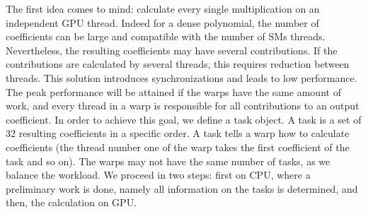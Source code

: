 \documentclass[oribibl]{llncs2e/llncs}
\begin{document}
The first idea comes to mind: calculate every single multiplication on an independent GPU thread. Indeed for a dense polynomial, the number of coefficients can be large and compatible with the number of SMs threads. Nevertheless, the resulting coefficients may have several contributions. If the contributions are calculated by several threads, this requires reduction between threads. This solution introduces   synchronizations and leads to low performance.
The peak performance will be attained if the warps have the same amount of work, and every  thread in a warp is responsible for all contributions to an output coefficient.
In order to achieve this goal, we define a task object. A task is a set of 32 resulting coefficients in a specific order. A task tells a  warp how to calculate coefficients (the thread number one of the warp takes the first coefficient of the task and so on). The warps may not have the same number of tasks, as we balance the workload.
We proceed in two  steps: first on CPU, where a preliminary work is done, namely all information on the tasks is determined, and then, the calculation on GPU.
\end{document}
